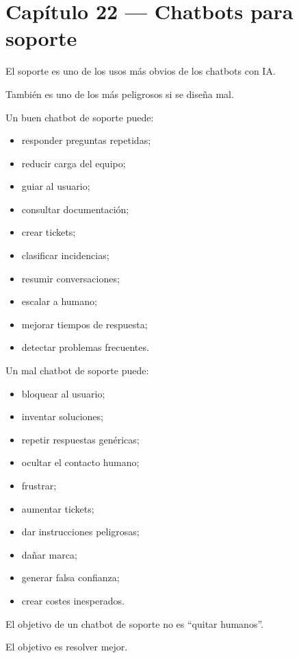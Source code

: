 \newpage

\chapter{Capítulo 22 --- Chatbots para
soporte}\label{capuxedtulo-22-chatbots-para-soporte}

El soporte es uno de los usos más obvios de los chatbots con IA.

También es uno de los más peligrosos si se diseña mal.

Un buen chatbot de soporte puede:

\begin{itemize}
\tightlist
\item
  responder preguntas repetidas;
\item
  reducir carga del equipo;
\item
  guiar al usuario;
\item
  consultar documentación;
\item
  crear tickets;
\item
  clasificar incidencias;
\item
  resumir conversaciones;
\item
  escalar a humano;
\item
  mejorar tiempos de respuesta;
\item
  detectar problemas frecuentes.
\end{itemize}

Un mal chatbot de soporte puede:

\begin{itemize}
\tightlist
\item
  bloquear al usuario;
\item
  inventar soluciones;
\item
  repetir respuestas genéricas;
\item
  ocultar el contacto humano;
\item
  frustrar;
\item
  aumentar tickets;
\item
  dar instrucciones peligrosas;
\item
  dañar marca;
\item
  generar falsa confianza;
\item
  crear costes inesperados.
\end{itemize}

El objetivo de un chatbot de soporte no es ``quitar humanos''.

El objetivo es resolver mejor.


